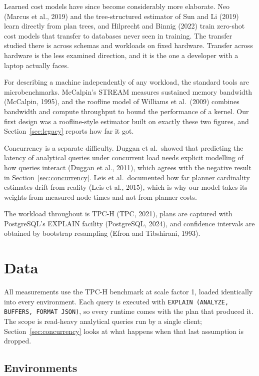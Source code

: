 \documentclass[runningheads]{llncs}
\begin{document}
Learned cost models have since become considerably more elaborate. Neo
(Marcus et al., 2019) and the tree-structured estimator of Sun and Li (2019)
learn directly from plan trees, and Hilprecht and Binnig (2022) train
zero-shot cost models that transfer to databases never seen in training. The
transfer studied there is across schemas and workloads on fixed hardware.
Transfer across hardware is the less examined direction, and it is the one a
developer with a laptop actually faces.

For describing a machine independently of any workload, the standard tools are
microbenchmarks. McCalpin's STREAM measures sustained memory bandwidth
(McCalpin, 1995), and the roofline model of Williams et al.\ (2009) combines
bandwidth and compute throughput to bound the performance of a kernel. Our
first design was a roofline-style estimator built on exactly these two
figures, and Section~\ref{sec:legacy} reports how far it got.

Concurrency is a separate difficulty. Duggan et al.\ showed that predicting
the latency of analytical queries under concurrent load needs explicit
modelling of how queries interact (Duggan et al., 2011), which agrees with
the negative result in Section~\ref{sec:concurrency}. Leis et al.\ documented
how far planner cardinality estimates drift from reality (Leis et al., 2015),
which is why our model takes its weights from measured node times and not
from planner costs.

The workload throughout is TPC-H (TPC, 2021), plans are captured with
PostgreSQL's EXPLAIN facility (PostgreSQL, 2024), and confidence intervals are
obtained by bootstrap resampling (Efron and Tibshirani, 1993).

\section{Data}

All measurements use the TPC-H benchmark at scale factor 1, loaded
identically into every environment. Each query is executed with
\texttt{EXPLAIN (ANALYZE, BUFFERS, FORMAT JSON)}, so every runtime comes with
the plan that produced it. The scope is read-heavy analytical queries run by
a single client; Section~\ref{sec:concurrency} looks at what happens when
that last assumption is dropped.

\subsection{Environments}
\end{document}
